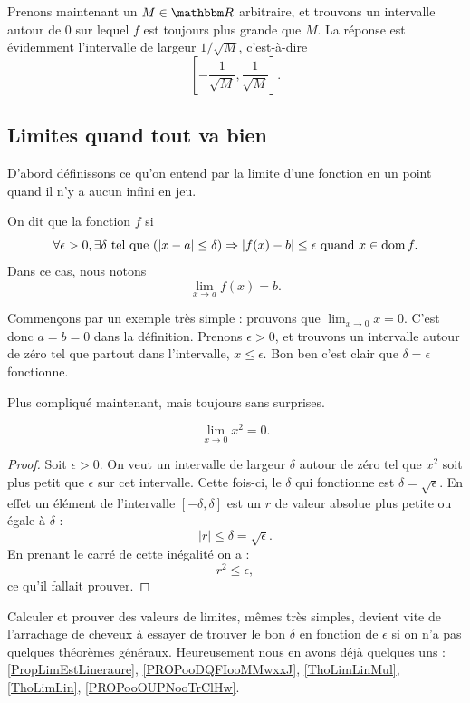 Prenons maintenant un $M\in\eR$ arbitraire, et trouvons un intervalle autour de $0$ sur lequel $f$ est toujours plus grande que $M$. La réponse est évidemment l'intervalle de largeur $1/\sqrt{M}$, c'est-à-dire
\[
  \left[ -\frac{ 1 }{ \sqrt{M} },\frac{ 1 }{ \sqrt{M} } \right].
\]

\subsection{Limites quand tout va bien}

D'abord définissons ce qu'on entend par la limite d'une fonction en un point quand il n'y a aucun infini en jeu.
\begin{definition}      \label{DefLimPointSansInfini}
 On dit que la fonction $f$  si
\[
  \forall \epsilon>0,\exists\delta\text{ tel que } (| x-a |\leq\delta)\Rightarrow | f(x)-b |\leq \epsilon\text{ quand }x\in\operatorname{dom} f.
\]
Dans ce cas, nous notons
\begin{equation}
\lim_{x\to a}f(x)=b.
\end{equation}
\end{definition}

Commençons par un exemple très simple : prouvons que $\lim_{x\to 0}x=0$. C'est donc $a=b=0$ dans la définition. Prenons $\epsilon>0$, et trouvons un intervalle autour de zéro tel que partout dans l'intervalle, $x\leq \epsilon$. Bon ben c'est clair que $\delta=\epsilon$ fonctionne.

Plus compliqué maintenant, mais toujours sans surprises.

\begin{proposition}
\[
  \lim_{x\to 0}x^2=0.
\]

\end{proposition}

\begin{proof}
Soit $\epsilon>0$. On veut un intervalle de largeur $\delta$ autour de zéro tel que $x^2$ soit plus petit que $\epsilon$ sur cet intervalle. Cette fois-ci, le $\delta$ qui fonctionne est $\delta=\sqrt{\epsilon}$. En effet un élément de l'intervalle $[-\delta,\delta]$ est un $r$ de valeur absolue plus petite ou égale à $\delta$ :
\[
| r |\leq\delta=\sqrt{\epsilon}.
\]
En prenant le carré de cette inégalité on a :
\[
  r^2\leq\epsilon,
\]
ce qu'il fallait prouver.
\end{proof}

Calculer et prouver des valeurs de limites, mêmes très simples, devient vite de l'arrachage de cheveux à essayer de trouver le bon $\delta$ en fonction de $\epsilon$ si on n'a pas quelques théorèmes généraux. Heureusement nous en avons déjà quelques uns : \ref{PropLimEstLineraure}, \ref{PROPooDQFIooMMwxxJ}, \ref{ThoLimLinMul}, \ref{ThoLimLin}, \ref{PROPooOUPNooTrClHw}.

